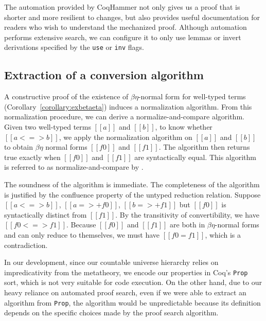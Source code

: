 \documentclass[\ifpublic nolinenum\else\fi,online,OA]{jfp}
\newcommand{\jc}[1]{}
\theoremstyle{definition}
\begin{document}
The automation provided by CoqHammer not only gives us a proof that is shorter
and more resilient to changes, but also provides useful documentation for
readers who wish to understand the mechanized proof. Although automation
performs extensive search, we can configure it to only use lemmas or invert
derivations specified by the \texttt{use} or \texttt{inv} flags.

\jc{Just a digression but I find that CoqHammer automated proofs are \emph{not}
good documentation compared to how we might have otherwise written the proofs
manually. While the flags indicate what lemmas and inversions \emph{may} be used,
the \texttt{best} tactic does not delete unused ones, so there's no way of knowing
which ones actually \emph{are} used, and the automation hides away \emph{how} they
are used. Automation makes proofs resilient to change when things go right, but
when things go wrong, it becomes much harder to discern what lemmas I need to add
when I don't even know where the existing ones are used.}

\ifextended
\subsection{Extraction of a conversion algorithm}
\label{sec:conversionalgo}
A constructive proof of the existence of $\beta\eta$-normal form
for well-typed terms (Corollary~\ref{corollary:exbetaeta}) induces a
normalization algorithm. From this normalization procedure, we can
derive a normalize-and-compare algorithm. Given two well-typed terms
$[[a]]$ and $[[b]]$, to know whether $[[a <=> b]]$, we apply the
normalization algorithm on $[[a]]$ and $[[b]]$ to obtain $\beta\eta$
normal forms $[[f0]]$ and $[[f1]]$. The algorithm then returns true
exactly when $[[f0]]$ and $[[f1]]$ are syntactically equal. This
algorithm is referred to as normalize-and-compare by
\citet{pierce2004advanced}.

The soundness of the algorithm is immediate. The completeness of the
algorithm is justified by the confluence property of the untyped
reduction relation. Suppose $[[a <=> b]]$, $[[a =>+ f0]]$, $[[b =>+
f1]]$ but $[[f0]]$ is syntactically distinct from $[[f1]]$. By the transitivity of convertibility, we have $[[f0 <=> f1]]$.
Because $[[f0]]$ and $[[f1]]$ are both in
$\beta\eta$-normal forms and can only reduce to themselves, we must
have $[[f0 = f1]]$, which is a contradiction.

In our development, since our countable universe hierarchy
relies on impredicativity from the metatheory, we encode our
properties in Coq's \texttt{Prop} sort, which is not very suitable for
code execution. On the other hand, due to our heavy reliance on
automated proof search, even if we were able to extract an algorithm from \texttt{Prop},
the algorithm would be unpredictable because its definition depends on
the specific choices made by the proof search algorithm.
\end{document}
